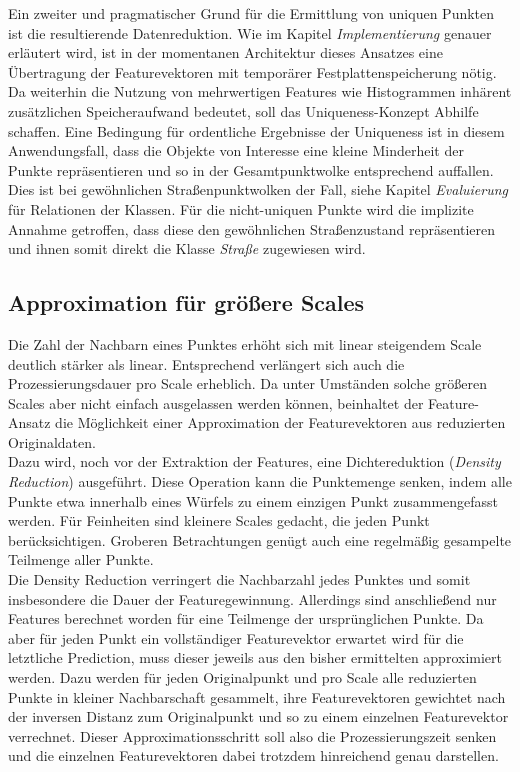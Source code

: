 Ein zweiter und pragmatischer Grund für die Ermittlung von uniquen Punkten ist die resultierende Datenreduktion. Wie im Kapitel \textit{Implementierung} genauer erläutert wird, ist in der momentanen Architektur dieses Ansatzes eine Übertragung der Featurevektoren mit temporärer Festplattenspeicherung nötig. Da weiterhin die Nutzung von mehrwertigen Features wie Histogrammen inhärent zusätzlichen Speicheraufwand bedeutet, soll das Uniqueness-Konzept Abhilfe schaffen. Eine Bedingung für ordentliche Ergebnisse der Uniqueness ist in diesem Anwendungsfall, dass die Objekte von Interesse eine kleine Minderheit der Punkte repräsentieren und so in der Gesamtpunktwolke entsprechend auffallen. Dies ist bei gewöhnlichen Straßenpunktwolken der Fall, siehe Kapitel \textit{Evaluierung} für Relationen der Klassen. Für die nicht-uniquen Punkte wird die implizite Annahme getroffen, dass diese den gewöhnlichen Straßenzustand repräsentieren und ihnen somit direkt die Klasse \textit{Straße} zugewiesen wird.

\subsection{Approximation für größere Scales} 

Die Zahl der Nachbarn eines Punktes erhöht sich mit linear steigendem Scale deutlich stärker als linear. Entsprechend verlängert sich auch die Prozessierungsdauer pro Scale erheblich. Da unter Umständen solche größeren Scales aber nicht einfach ausgelassen werden können, beinhaltet der Feature-Ansatz die Möglichkeit einer Approximation der Featurevektoren aus reduzierten Originaldaten. \\
Dazu wird, noch vor der Extraktion der Features, eine Dichtereduktion (\textit{Density Reduction}) ausgeführt. Diese Operation kann die Punktemenge senken, indem alle Punkte etwa innerhalb eines Würfels zu einem einzigen Punkt zusammengefasst werden. Für Feinheiten sind kleinere Scales gedacht, die jeden Punkt berücksichtigen. Groberen Betrachtungen genügt auch eine regelmäßig gesampelte Teilmenge aller Punkte. \\
Die Density Reduction verringert die Nachbarzahl jedes Punktes und somit insbesondere die Dauer der Featuregewinnung. Allerdings sind anschließend nur Features berechnet worden für eine Teilmenge der ursprünglichen Punkte. Da aber für jeden Punkt ein vollständiger Featurevektor erwartet wird für die letztliche Prediction, muss dieser jeweils aus den bisher ermittelten approximiert werden. Dazu werden für jeden Originalpunkt und pro Scale alle reduzierten Punkte in kleiner Nachbarschaft gesammelt, ihre Featurevektoren gewichtet nach der inversen Distanz zum Originalpunkt und so zu einem einzelnen Featurevektor verrechnet. Dieser Approximationsschritt soll also die Prozessierungszeit senken und die einzelnen Featurevektoren dabei trotzdem hinreichend genau darstellen.

